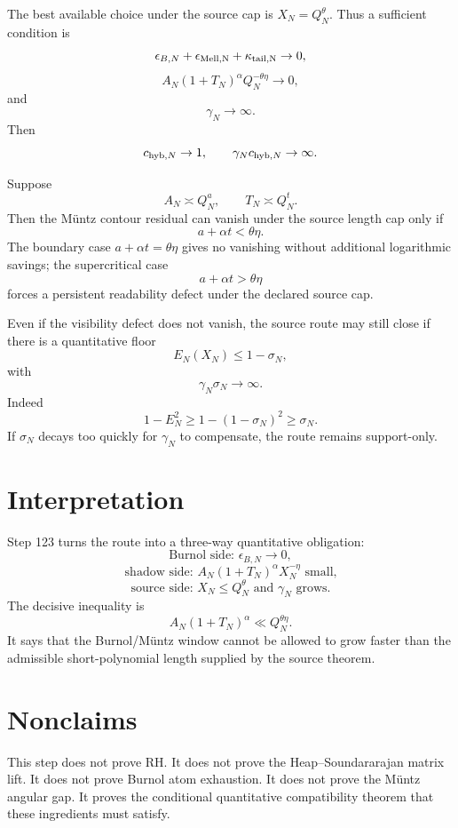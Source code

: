 \documentclass[11pt]{article}
\begin{document}
\begin{corollary}
The best available choice under the source cap is \(X_N=Q_N^\theta\).  Thus a sufficient condition is
\[
\epsilon_{B,N}+\epsilon_{\rm Mell,N}+\kappa_{\rm tail,N}\to0,
\]
\[
A_N(1+T_N)^\alpha Q_N^{-\theta\eta}\to0,
\]
and
\[
\gamma_N\to\infty.
\]
Then
\[
c_{{\rm hyb},N}\to1,
\qquad
\gamma_Nc_{{\rm hyb},N}\to\infty.
\]
\end{corollary}

\begin{corollary}
Suppose
\[
A_N\asymp Q_N^a,
\qquad
T_N\asymp Q_N^t.
\]
Then the Müntz contour residual can vanish under the source length cap only if
\[
\boxed{a+\alpha t<\theta\eta.}
\]
The boundary case \(a+\alpha t=\theta\eta\) gives no vanishing without additional logarithmic savings; the supercritical case
\[
a+\alpha t>\theta\eta
\]
forces a persistent readability defect under the declared source cap.
\end{corollary}

\begin{corollary}
Even if the visibility defect does not vanish, the source route may still close if there is a quantitative floor
\[
E_N(X_N)\le 1-\sigma_N,
\]
with
\[
\gamma_N\sigma_N\to\infty.
\]
Indeed
\[
1-E_N^2\ge 1-(1-\sigma_N)^2\ge \sigma_N.
\]
If \(\sigma_N\) decays too quickly for \(\gamma_N\) to compensate, the route remains support-only.
\end{corollary}

\section{Interpretation}
Step 123 turns the route into a three-way quantitative obligation:
\[
\boxed{\text{Burnol side: }\epsilon_{B,N}\to0,}
\]
\[
\boxed{\text{shadow side: }A_N(1+T_N)^\alpha X_N^{-\eta}\text{ small,}}
\]
\[
\boxed{\text{source side: }X_N\le Q_N^\theta\text{ and }\gamma_N\text{ grows}.}
\]
The decisive inequality is
\[
\boxed{A_N(1+T_N)^\alpha\ll Q_N^{\theta\eta}.}
\]
It says that the Burnol/Müntz window cannot be allowed to grow faster than the admissible short-polynomial length supplied by the source theorem.

\section{Nonclaims}
This step does not prove RH.  It does not prove the Heap--Soundararajan matrix lift.  It does not prove Burnol atom exhaustion.  It does not prove the Müntz angular gap.  It proves the conditional quantitative compatibility theorem that these ingredients must satisfy.
\end{document}
